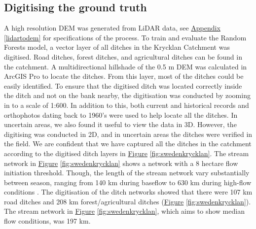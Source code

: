 \documentclass[]{interact}
\theoremstyle{plain}%
\theoremstyle{definition}
\theoremstyle{remark}
\begin{document}
\subsection{Digitising the ground truth}
A high resolution DEM was generated from LiDAR data, see \hyperref[lidartodem]{Appendix} \ref{lidartodem} for specifications of the process. To train and evaluate the Random Forests model, a vector layer of all ditches in the Krycklan Catchment \citep{krycklancatchment} was digitised. Road ditches, forest ditches, and agricultural ditches can be found in the catchment. A multidirectional hillshade of the 0.5 m DEM was calculated in ArcGIS Pro to locate the ditches. From this layer, most of the ditches could be easily identified. To ensure that the digitised ditch was located correctly inside the ditch and not on the bank nearby, the digitisation was conducted by zooming in to a scale of 1:600. In addition to this, both current and historical records and orthophotos dating back to 1960’s were used to help locate all the ditches. In uncertain areas, we also found it useful to view the data in 3D. However, the digitising was conducted in 2D, and in uncertain areas the ditches were verified in the field. We are confident that we have captured all the ditches in the catchment according to the digitised  ditch layers in \hyperref[fig:swedenkrycklan]{Figure} \ref{fig:swedenkrycklan}. The stream network in \hyperref[fig:swedenkrycklan]{Figure} \ref{fig:swedenkrycklan} shows a network with a 8 hectare flow initiation threshold. Though, the length of the stream network vary substantially between season, ranging from 140 km during baseflow to 630 km during high-flow conditions \citep{mappingtemporal}. The digitisation of the ditch networks showed that there were 107 km road ditches and 208 km forest/agricultural ditches (\hyperref[fig:swedenkrycklan]{Figure} \ref{fig:swedenkrycklan}). The stream network in \hyperref[fig:swedenkrycklan]{Figure} \ref{fig:swedenkrycklan}, which aims to show median flow conditions, was 197 km.
\end{document}
